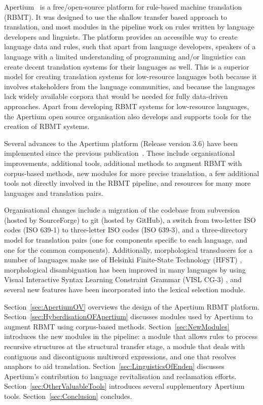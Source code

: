 \documentclass[free]{flammie}
\begin{document}
Apertium~\cite{forcada2011apertium} is a free/open-source platform for
rule-based machine translation (RBMT). It was designed to use the shallow
transfer based approach to translation, and most modules in the pipeline work on
rules written by language developers and linguists. The platform provides an
accessible way to create language data and rules, such that apart from language
developers, speakers of a language with a limited understanding of programming
and/or linguistics can create decent translation systems for their languages as
well. This is a superior model for creating translation systems for low-resource
languages both because it involves stakeholders from the language communities,
and because the languages lack widely available corpora that would be needed for
fully data-driven approaches. Apart from developing RBMT systems for
low-resource languages, the Apertium open source organisation also develops and
supports tools for the creation of RBMT systems.


Several advances to the Apertium platform (Release version 3.6) have been
implemented since the previous publication~\cite{forcada2011apertium}. These
include organisational improvements, additional tools, additional methods to
augment RBMT with corpus-based methods, new modules for more precise
translation, a few additional tools not directly involved in the RBMT pipeline,
and resources for many more languages and translation pairs.

Organisational changes include a migration of the codebase from subversion
(hosted by SourceForge) to git (hosted by GitHub), a switch from two-letter ISO
codes (ISO 639-1) to three-letter ISO codes (ISO 639-3), and a three-directory
model for translation pairs (one for components specific to each language, and
one for the common components). Additionally, morphological transducers for a
number of languages make use of Helsinki Finite-State Technology (HFST)
\cite{linden2011hfst}, morphological disambiguation has been improved in many
languages by using Visual Interactive Syntax Learning Constraint Grammar (VISL
CG-3) \cite{bick2015cg}, and several new features have been incorporated into
the lexical selection module.

Section~\ref{sec:ApertiumOV} overviews the design of the Apertium RBMT platform.
Section~\ref{sec:HyberdisationOFApertium} discusses modules used by Apertium to
augment RBMT using corpus-based methods. Section~\ref{sec:NewModules} introduces
the new modules in the pipeline: a module that allows rules to process recursive
structures at the structural transfer stage, a module that deals with contiguous
and discontiguous multiword expressions, and one that resolves anaphors to aid
translation. Section~\ref{sec:LinguisticsOfEnden} discusses Apertium's
contribution to language revitalisation and reclamation efforts.
Section~\ref{sec:OtherValuableTools} introduces several supplementary Apertium
tools. Section~\ref{sec:Conclusion} concludes.
\end{document}
